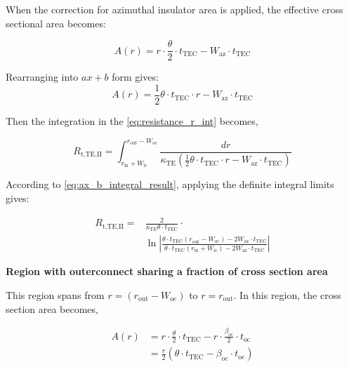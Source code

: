 \documentclass[10pt,a4paper,twocolumn]{article}
\begin{document}
When the correction for azimuthal insulator area is applied, the effective cross sectional area becomes:

\begin{equation*}
	A(r) = r \cdot \frac{\theta}{2}  \cdot t_{\text{TEC}} - W_{\text{az}} \cdot t_{\text{TEC}}
\end{equation*}

Rearranging into $ax+b$ form gives:
\begin{equation}
	A(r) = \frac{1}{2}\theta \cdot t_{\text{TEC}} \cdot r - W_{\text{az}} \cdot t_{\text{TEC}}
	\label{eq:area_TE_full}
\end{equation}

Then the integration in the \cref{eq:resistance_r_int} becomes,

\begin{equation*}
	R_{\text{t,TE,II}} = \int_{r_{\text{in}}+W_{\text{ic}}}^{r_{\text{out}}-W_{\text{oc}}} \frac{dr}{\kappa_{\text{TE}} \left( \frac{1}{2}\theta \cdot t_{\text{TEC}} \cdot r - W_{\text{az}} \cdot t_{\text{TEC}} \right)}
\end{equation*}

According to \cref{eq:ax_b_integral_result}, applying the definite integral limits gives:

\begin{equation}
	\begin{aligned}
		R_{\text{t,TE,II}} = & \frac{2}{\kappa_{\text{TE}} \theta \cdot t_{\text{TEC}}} \cdot \\ & \ln \left| \frac{\theta \cdot t_{\text{TEC}} (r_{\text{out}}-W_{\text{oc}}) - 2 W_{\text{az}} \cdot t_{\text{TEC}}}{\theta \cdot t_{\text{TEC}} (r_{\text{in}}+W_{\text{ic}}) - 2 W_{\text{az}} \cdot t_{\text{TEC}}} \right|
		\label{eq:TE_II_t_res}
	\end{aligned}
\end{equation}

\textbf{Region with outerconnect sharing  a fraction of cross section area}

This region spans from $r=(r_{\text{out}}-W_{\text{oc}})$ to $r=r_{\text{out}}$. In this region, the cross section area becomes,

\begin{equation*}
	\begin{aligned}
		A(r) & = r\cdot \frac{\theta}{2} \cdot t_{\text{TEC}} - r \cdot \frac{\beta_{\text{oc}}}{2} \cdot t_{\text{oc}} \\
		     & = \frac{r}{2} (\theta \cdot t_{\text{TEC}} - \beta_{\text{oc}} \cdot t_{\text{oc}} )
	\end{aligned}
\end{equation*}
\end{document}
